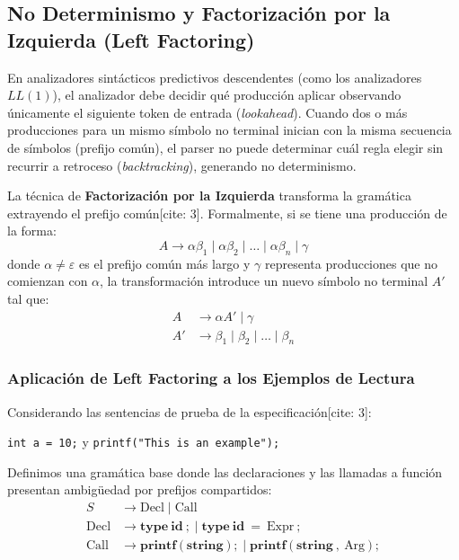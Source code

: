 \documentclass[letterpaper,12pt,oneside]{article}
\begin{document}
\subsection{No Determinismo y Factorización por la Izquierda (Left Factoring)}
En analizadores sintácticos predictivos descendentes (como los analizadores $LL(1)$), el analizador debe decidir qué producción aplicar observando únicamente el siguiente token de entrada (\textit{lookahead}). Cuando dos o más producciones para un mismo símbolo no terminal inician con la misma secuencia de símbolos (prefijo común), el parser no puede determinar cuál regla elegir sin recurrir a retroceso (\textit{backtracking}), generando no determinismo.

La técnica de \textbf{Factorización por la Izquierda} transforma la gramática extrayendo el prefijo común[cite: 3]. Formalmente, si se tiene una producción de la forma:
\begin{equation}
    A \to \alpha \beta_1 \mid \alpha \beta_2 \mid \dots \mid \alpha \beta_n \mid \gamma
\end{equation}
donde $\alpha \neq \varepsilon$ es el prefijo común más largo y $\gamma$ representa producciones que no comienzan con $\alpha$, la transformación introduce un nuevo símbolo no terminal $A'$ tal que:
\begin{align}
    A &\to \alpha A' \mid \gamma \\
    A' &\to \beta_1 \mid \beta_2 \mid \dots \mid \beta_n
\end{align}

\subsubsection{Aplicación de Left Factoring a los Ejemplos de Lectura}
Considerando las sentencias de prueba de la especificación[cite: 3]:
\begin{center}
    \texttt{int a = 10;} \quad y \quad \texttt{printf("This is an example");}
\end{center}

Definimos una gramática base donde las declaraciones y las llamadas a función presentan ambigüedad por prefijos compartidos:
\begin{align}
    S &\to \text{Decl} \mid \text{Call} \\
    \text{Decl} &\to \mathbf{type} \ \mathbf{id} \ \mathbf{;} \;\Big|\; \mathbf{type} \ \mathbf{id} \ \mathbf{=} \ \text{Expr} \ \mathbf{;} \label{eq:decl_orig} \\
    \text{Call} &\to \mathbf{printf} \ \mathbf{(} \ \mathbf{string} \ \mathbf{)} \ \mathbf{;} \;\Big|\; \mathbf{printf} \ \mathbf{(} \ \mathbf{string} \ \mathbf{,} \ \text{Arg} \ \mathbf{)} \ \mathbf{;} \label{eq:call_orig}
\end{align}
\end{document}
